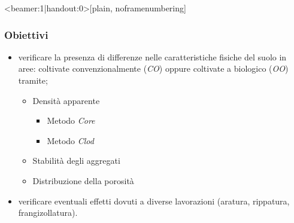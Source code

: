
\subtitle{\textbf{Uno
studio di fisica del suolo}}


\begin{frame}<beamer:1|handout:0>[plain, noframenumbering]
  \titlepage 
\end{frame}



\begin{frame}
  \frametitle{Obiettivi}
  \large
  \begin{itemize}[<+->]
  \item verificare la presenza di differenze nelle caratteristiche
    fisiche del suolo in aree: \newline coltivate convenzionalmente
    (\emph{CO}) \newline oppure \newline coltivate  a biologico (\emph{OO}) tramite;
    \begin{itemize}
    \item Densit\`a apparente
      \begin{itemize}
      \item Metodo \emph{Core}
      \item Metodo \emph{Clod}
      \end{itemize}
    \item Stabilit\`a degli aggregati
    \item Distribuzione della porosit\`a      
    \end{itemize}
  \item verificare eventuali effetti dovuti a diverse lavorazioni
    (aratura, rippatura, frangizollatura).
  \end{itemize}
\end{frame}



